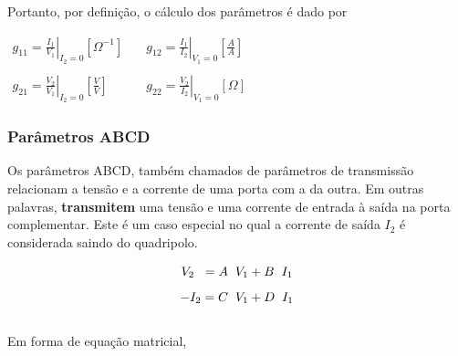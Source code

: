 \documentclass{article}
\numberwithin{equation}{section}
\begin{document}
    Portanto, por definição, o cálculo dos parâmetros é dado por
    \begin{center}
        $\begin{matrix} %
                g_{11}=\displaystyle\left.\frac{I_{1}}{V_{1}}\right|_{I_{2}=0} [\Omega^{-1}] &\quad g_{12}=\displaystyle\left.\frac{I_{1}}{I_{2}}\right|_{V_{1}=0}\left[\frac{A}{A}\right]\\\\
                g_{21}=\displaystyle\left.\frac{V_{2}}{V_{1}}\right|_{I_{2}=0}\left[\frac{V}{V}\right]&\quad
                g_{22}=\displaystyle\left.\frac{V_{2}}{I_{2}}\right|_{V_{1}=0} [\Omega]
        \end{matrix}$
    \end{center}


    \subsubsection{Parâmetros ABCD}
    \label{subsubsec:quadripolostransm}
    Os parâmetros ABCD, também chamados de parâmetros de transmissão relacionam a tensão e a corrente de uma porta com a da outra. Em outras palavras, \textbf{transmitem} uma tensão e uma corrente de entrada à saída na porta complementar. Este é um caso especial no qual a corrente de saída $I_{2}$ é considerada saindo do quadripolo.

    \begin{equation*}
        V_{2} \hspace{0.2cm} =A \hspace{0.2cm} V_{1}+ B \hspace{0.2cm} I_{1}
    \end{equation*}
    \begin{equation*}
        -I_{2}=C \hspace{0.2cm} V_{1}+D \hspace{0.2cm} I_{1}
    \end{equation*}\\
    Em forma de equação matricial,
\end{document}
